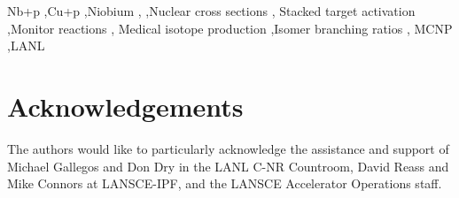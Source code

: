 \documentclass[3p]{elsarticle}
\begin{document}
\begin{frontmatter}
\begin{abstract}





\end{abstract}






\begin{keyword}
Nb+p \sep Cu+p \sep Niobium 
\sep {}  \sep Nuclear cross sections \sep 
Stacked target activation \sep Monitor reactions \sep 
Medical isotope production \sep Isomer branching ratios \sep  
MCNP \sep  LANL
% 
% 
\end{keyword}

\end{frontmatter}

















 
 \section{Acknowledgements}
 
 
 The authors would like to particularly acknowledge the assistance and support of  Michael Gallegos and Don Dry in the LANL C-NR Countroom, David Reass and Mike Connors at LANSCE-IPF, and the LANSCE Accelerator Operations staff. 
 
\end{document}
